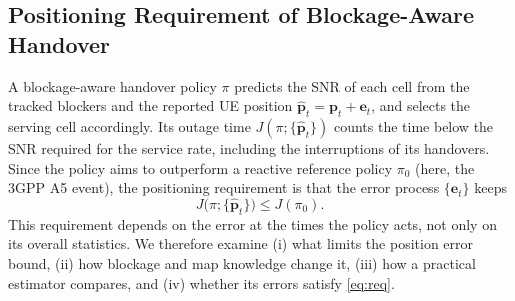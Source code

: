 \documentclass[conference]{IEEEtran}
\begin{document}
\subsection{Positioning Requirement of Blockage-Aware Handover}
A blockage-aware handover policy $\pi$ predicts the SNR of each cell
from the tracked blockers and the reported UE position
$\hat{\mathbf p}_t=\mathbf p_t+\mathbf e_t$, and selects the serving cell
accordingly. Its outage time $J(\pi;\{\hat{\mathbf p}_t\})$ counts the
time below the SNR required for the service rate, including the
interruptions of its handovers. Since the policy aims to outperform a
reactive reference policy $\pi_0$ (here, the 3GPP A5 event), the
positioning requirement is that the error process $\{\mathbf e_t\}$ keeps
\begin{equation}
J\bigl(\pi;\{\hat{\mathbf p}_t\}\bigr)\le J(\pi_0).
\label{eq:req}
\end{equation}
This requirement depends on the error at the times the policy acts, not
only on its overall statistics. We therefore examine (i) what limits
the position error bound, (ii) how blockage and map knowledge change it,
(iii) how a practical estimator compares, and (iv) whether its errors
satisfy \eqref{eq:req}.

\end{document}
